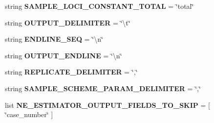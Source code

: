 \begin{DoxyCompactItemize}
\item 
string {\bfseries S\+A\+M\+P\+L\+E\+\_\+\+L\+O\+C\+I\+\_\+\+C\+O\+N\+S\+T\+A\+N\+T\+\_\+\+T\+O\+T\+AL} = \char`\"{}total\char`\"{}\hypertarget{namespacenegui_1_1pgdriveneestimator_abc1bee31f2ee48719489c57fb3173efa}{}\label{namespacenegui_1_1pgdriveneestimator_abc1bee31f2ee48719489c57fb3173efa}

\item 
string {\bfseries O\+U\+T\+P\+U\+T\+\_\+\+D\+E\+L\+I\+M\+I\+T\+ER} = \char`\"{}\textbackslash{}t\char`\"{}\hypertarget{namespacenegui_1_1pgdriveneestimator_a68b08075d6e1a58ae325c600881c9d6c}{}\label{namespacenegui_1_1pgdriveneestimator_a68b08075d6e1a58ae325c600881c9d6c}

\item 
string {\bfseries E\+N\+D\+L\+I\+N\+E\+\_\+\+S\+EQ} = \char`\"{}\textbackslash{}n\char`\"{}\hypertarget{namespacenegui_1_1pgdriveneestimator_aa8d38cb5ca07a3c1f89cd4c3d7cccb08}{}\label{namespacenegui_1_1pgdriveneestimator_aa8d38cb5ca07a3c1f89cd4c3d7cccb08}

\item 
string {\bfseries O\+U\+T\+P\+U\+T\+\_\+\+E\+N\+D\+L\+I\+NE} = \char`\"{}\textbackslash{}n\char`\"{}\hypertarget{namespacenegui_1_1pgdriveneestimator_a56a1a1d753221dfbed6ffc7cd58222f1}{}\label{namespacenegui_1_1pgdriveneestimator_a56a1a1d753221dfbed6ffc7cd58222f1}

\item 
string {\bfseries R\+E\+P\+L\+I\+C\+A\+T\+E\+\_\+\+D\+E\+L\+I\+M\+I\+T\+ER} = \char`\"{},\char`\"{}\hypertarget{namespacenegui_1_1pgdriveneestimator_a4a72408d1cee500503a7aa185253b438}{}\label{namespacenegui_1_1pgdriveneestimator_a4a72408d1cee500503a7aa185253b438}

\item 
string {\bfseries S\+A\+M\+P\+L\+E\+\_\+\+S\+C\+H\+E\+M\+E\+\_\+\+P\+A\+R\+A\+M\+\_\+\+D\+E\+L\+I\+M\+I\+T\+ER} = \char`\"{},\char`\"{}\hypertarget{namespacenegui_1_1pgdriveneestimator_a968165e72c6ac1b942ae21dc2ec18af2}{}\label{namespacenegui_1_1pgdriveneestimator_a968165e72c6ac1b942ae21dc2ec18af2}

\item 
list {\bfseries N\+E\+\_\+\+E\+S\+T\+I\+M\+A\+T\+O\+R\+\_\+\+O\+U\+T\+P\+U\+T\+\_\+\+F\+I\+E\+L\+D\+S\+\_\+\+T\+O\+\_\+\+S\+K\+IP} = \mbox{[} \char`\"{}case\+\_\+number\char`\"{} \mbox{]}\hypertarget{namespacenegui_1_1pgdriveneestimator_a77c91566694093f57286607ae144d35a}{}\label{namespacenegui_1_1pgdriveneestimator_a77c91566694093f57286607ae144d35a}


\end{DoxyCompactItemize}
